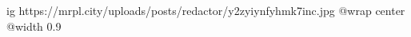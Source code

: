  
 
 
 
 

\ifcmt
  ig https://mrpl.city/uploads/posts/redactor/y2zyiynfyhmk7inc.jpg
  @wrap center
  @width 0.9
\fi
